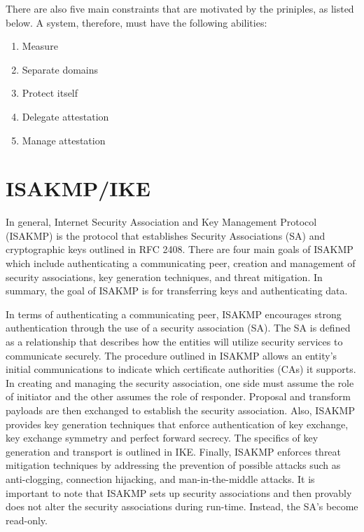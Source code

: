 \documentclass[10pt]{report}
\begin{document}
There are also five main constraints that are motivated by the priniples,
as listed below. A system, therefore, must have the following abilities:

\begin{enumerate}
	\item Measure
	\item Separate domains
	\item Protect itself
	\item Delegate attestation
	\item Manage attestation
\end{enumerate}

\chapter{ISAKMP/IKE} 

In general, Internet Security Association and Key Management Protocol
(ISAKMP) is the protocol that establishes Security Associations
(SA) and cryptographic keys outlined in RFC 2408. There are
four main goals of ISAKMP which include authenticating a communicating
peer, creation and management of security associations, key generation techniques,
and threat mitigation. In summary, the goal of ISAKMP is for transferring keys
and authenticating data. 

In terms of authenticating a communicating peer, ISAKMP encourages
strong authentication through the use of a security association (SA). The SA is defined 
as a relationship that describes how the entities will utilize security services to 
communicate securely. The procedure
outlined in ISAKMP allows an entity's initial
communications to indicate which certificate authorities (CAs) it supports.
In creating and managing the security association, one side must assume the role
of initiator and the other assumes the role of responder. Proposal and
transform payloads are then exchanged to establish the security association.
Also, ISAKMP provides key generation techniques that enforce  authentication
of key exchange, key exchange symmetry and perfect forward secrecy. The specifics
of key generation and transport is outlined in IKE. Finally, ISAKMP enforces
threat mitigation techniques by addressing the prevention of possible attacks
such as anti-clogging, connection hijacking, and man-in-the-middle attacks.
It is important to note that ISAKMP sets up security associations and then 
provably does not alter the security associations during run-time. Instead,
the SA's become read-only. 
\end{document}
